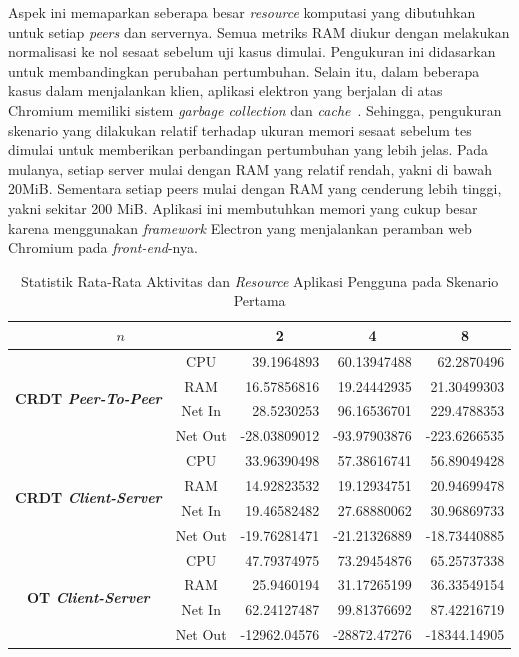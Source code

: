 Aspek ini memaparkan seberapa besar \textit{resource} komputasi yang dibutuhkan untuk setiap \textit{peers} dan servernya. Semua metriks RAM diukur dengan melakukan normalisasi ke nol sesaat sebelum uji kasus dimulai. Pengukuran ini didasarkan untuk membandingkan perubahan pertumbuhan. Selain itu, dalam beberapa kasus dalam menjalankan klien, aplikasi elektron yang berjalan di atas Chromium memiliki sistem \textit{garbage collection} dan \textit{cache}~\citep{chromium}. Sehingga, pengukuran skenario yang dilakukan relatif terhadap ukuran memori sesaat sebelum tes dimulai untuk memberikan perbandingan pertumbuhan yang lebih jelas. Pada mulanya, setiap server mulai dengan RAM yang relatif rendah, yakni di bawah 20MiB. Sementara setiap peers mulai dengan RAM yang cenderung lebih tinggi, yakni sekitar 200 MiB. Aplikasi ini membutuhkan memori yang cukup besar karena menggunakan \textit{framework} Electron yang menjalankan peramban web Chromium pada \textit{front-end}-nya.

\begin{table}[H]
 \centering

\begin{tabular}{|cc|r|r|r|}
\hline
\multicolumn{2}{|c|}{$n$} & \multicolumn{1}{c|}{\textbf{2}} & \multicolumn{1}{c|}{\textbf{4}} & \multicolumn{1}{c|}{\textbf{8}} \\ \hline
\multicolumn{1}{|c|}{\multirow{4}{*}{\textbf{CRDT \textit{Peer-To-Peer}}}} & CPU & 39.1964893 & 60.13947488 & 62.2870496 \\ \cline{2-5}
\multicolumn{1}{|c|}{} & RAM & 16.57856816 & 19.24442935 & 21.30499303 \\ \cline{2-5}
\multicolumn{1}{|c|}{} & Net In & 28.5230253 & 96.16536701 & 229.4788353 \\ \cline{2-5}
\multicolumn{1}{|c|}{} & Net Out & -28.03809012 & -93.97903876 & -223.6266535 \\ \hline
\multicolumn{1}{|c|}{\multirow{4}{*}{\textbf{CRDT \textit{Client-Server}}}} & CPU & 33.96390498 & 57.38616741 & 56.89049428 \\ \cline{2-5}
\multicolumn{1}{|c|}{} & RAM & 14.92823532 & 19.12934751 & 20.94699478 \\ \cline{2-5}
\multicolumn{1}{|c|}{} & Net In & 19.46582482 & 27.68880062 & 30.96869733 \\ \cline{2-5}
\multicolumn{1}{|c|}{} & Net Out & -19.76281471 & -21.21326889 & -18.73440885 \\ \hline
\multicolumn{1}{|c|}{\multirow{4}{*}{\textbf{OT \textit{Client-Server}}}} & CPU & 47.79374975 & 73.29454876 & 65.25737338 \\ \cline{2-5}
\multicolumn{1}{|c|}{} & RAM & 25.9460194 & 31.17265199 & 36.33549154 \\ \cline{2-5}
\multicolumn{1}{|c|}{} & Net In & 62.24127487 & 99.81376692 & 87.42216719 \\ \cline{2-5}
\multicolumn{1}{|c|}{} & Net Out & -12962.04576 & -28872.47276 & -18344.14905 \\ \hline
\end{tabular}
 \label{tab:resource-client-1}
 \caption{Statistik Rata-Rata Aktivitas dan \textit{Resource} Aplikasi Pengguna pada Skenario Pertama}
\end{table}


